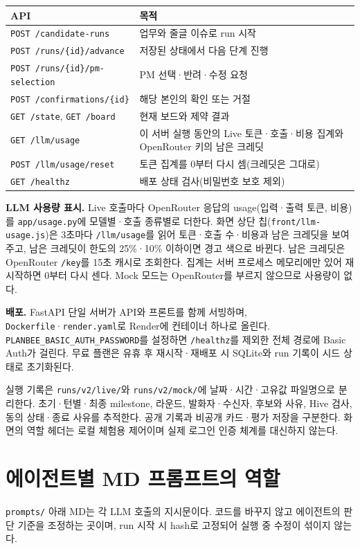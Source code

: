 \documentclass[11pt,a4paper]{article}
\begin{document}
\begin{tabularx}{\linewidth}{@{}p{69mm}Y@{}}\toprule
API & 목적\\\midrule
\texttt{POST /candidate-runs} & 업무와 줄글 이슈로 run 시작\\
\texttt{POST /runs/\{id\}/advance} & 저장된 상태에서 다음 단계 진행\\
\texttt{POST /runs/\{id\}/pm-selection} & PM 선택·반려·수정 요청\\
\texttt{POST /confirmations/\{id\}} & 해당 본인의 확인 또는 거절\\
\texttt{GET /state}, \texttt{GET /board} & 현재 보드와 제약 결과\\
\texttt{GET /llm/usage} & 이 서버 실행 동안의 Live 토큰·호출·비용 집계와 OpenRouter 키의 남은 크레딧\\
\texttt{POST /llm/usage/reset} & 토큰 집계를 0부터 다시 셈(크레딧은 그대로)\\
\texttt{GET /healthz} & 배포 상태 검사(비밀번호 보호 제외)\\\bottomrule
\end{tabularx}

\textbf{LLM 사용량 표시.} Live 호출마다 OpenRouter 응답의 usage(입력·출력 토큰, 비용)를 \texttt{app/usage.py}에 모델별·호출 종류별로 더한다. 화면 상단 칩(\texttt{front/llm-usage.js})은 3초마다 \texttt{/llm/usage}를 읽어 토큰·호출 수·비용과 남은 크레딧을 보여 주고, 남은 크레딧이 한도의 25\%·10\% 이하이면 경고 색으로 바뀐다. 남은 크레딧은 OpenRouter \texttt{/key}를 15초 캐시로 조회한다. 집계는 서버 프로세스 메모리에만 있어 재시작하면 0부터 다시 센다. Mock 모드는 OpenRouter를 부르지 않으므로 사용량이 없다.

\textbf{배포.} FastAPI 단일 서버가 API와 프론트를 함께 서빙하며, \texttt{Dockerfile}·\texttt{render.yaml}로 Render에 컨테이너 하나로 올린다. \texttt{PLANBEE\_BASIC\_AUTH\_PASSWORD}를 설정하면 \texttt{/healthz}를 제외한 전체 경로에 Basic Auth가 걸린다. 무료 플랜은 유휴 후 재시작·재배포 시 SQLite와 run 기록이 시드 상태로 초기화된다.

실행 기록은 \texttt{runs/v2/live/}와 \texttt{runs/v2/mock/}에 날짜·시간·고유값 파일명으로 분리한다. 초기·턴별·최종 milestone, 라운드, 발화자·수신자, 후보와 사유, Hive 검사, 동의 상태·종료 사유를 추적한다. 공개 기록과 비공개 카드·평가 저장을 구분한다. 화면의 역할 헤더는 로컬 체험용 제어이며 실제 로그인 인증 체계를 대신하지 않는다.

\newpage
\section{에이전트별 MD 프롬프트의 역할}
\texttt{prompts/} 아래 MD는 각 LLM 호출의 지시문이다. 코드를 바꾸지 않고 에이전트의 판단 기준을 조정하는 곳이며, run 시작 시 hash로 고정되어 실행 중 수정이 섞이지 않는다.
\end{document}
